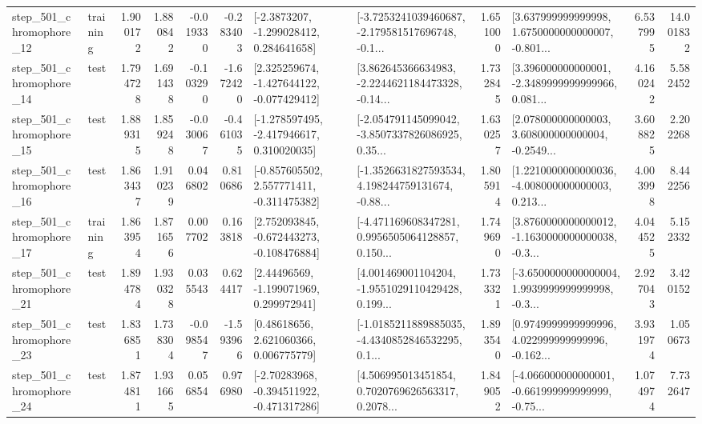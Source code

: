 \begin{tabular}{llrrrrllrlrr}
  step\_501\_chromophore\_12 &  training &      1.900172 &    1.880842 &     -0.019330 & -0.283403 &     [-2.3873207, -1.299028412, 0.284641658] &  [-3.7253241039460687, -2.179581517696748, -0.1... &       1.651000 &  [3.637999999999998, 1.6750000000000007, -0.801... &            6.537995 &         14.001832 \\
  step\_501\_chromophore\_14 &      test &      1.794728 &    1.691438 &     -0.103290 & -1.672420 &   [2.325259674, -1.427644122, -0.077429412] &  [3.862645366634983, -2.2244621184473328, -0.14... &       1.732845 &  [3.396000000000001, -2.3489999999999966, 0.081... &            4.160242 &          5.582452 \\
  step\_501\_chromophore\_15 &      test &      1.889315 &    1.859248 &     -0.030067 & -0.461035 &   [-1.278597495, -2.417946617, 0.310020035] &  [-2.054791145099042, -3.8507337826086925, 0.35... &       1.630257 &  [2.078000000000003, 3.608000000000004, -0.2549... &            3.608825 &          2.202268 \\
  step\_501\_chromophore\_16 &      test &      1.863437 &    1.910239 &      0.046802 &  0.810686 &   [-0.857605502, 2.557771411, -0.311475382] &  [-1.3526631827593534, 4.198244759131674, -0.88... &       1.805914 &  [1.2210000000000036, -4.008000000000003, 0.213... &            4.003998 &          8.442256 \\
  step\_501\_chromophore\_17 &  training &      1.863954 &    1.871656 &      0.007702 &  0.163818 &   [2.752093845, -0.672443273, -0.108476884] &  [-4.471169608347281, 0.9956505064128857, 0.150... &       1.749690 &  [3.8760000000000012, -1.1630000000000038, -0.3... &            4.044525 &          5.152332 \\
  step\_501\_chromophore\_21 &      test &      1.894784 &    1.930328 &      0.035543 &  0.624417 &     [2.44496569, -1.199071969, 0.299972941] &  [4.001469001104204, -1.9551029110429428, 0.199... &       1.733321 &  [-3.6500000000000004, 1.9939999999999998, -0.3... &            2.927043 &          3.420152 \\
  step\_501\_chromophore\_23 &      test &      1.836851 &    1.738304 &     -0.098547 & -1.593966 &      [0.48618656, 2.621060366, 0.006775779] &  [-1.0185211889885035, -4.4340852846532295, 0.1... &       1.893540 &  [0.9749999999999996, 4.022999999999996, -0.162... &            3.931974 &          1.050673 \\
  step\_501\_chromophore\_24 &      test &      1.874811 &    1.931665 &      0.056854 &  0.976980 &   [-2.70283968, -0.394511922, -0.471317286] &  [4.506995013451854, 0.7020769626563317, 0.2078... &       1.849052 &  [-4.066000000000001, -0.661999999999999, -0.75... &            1.074974 &          7.732647 \\

\end{tabular}
